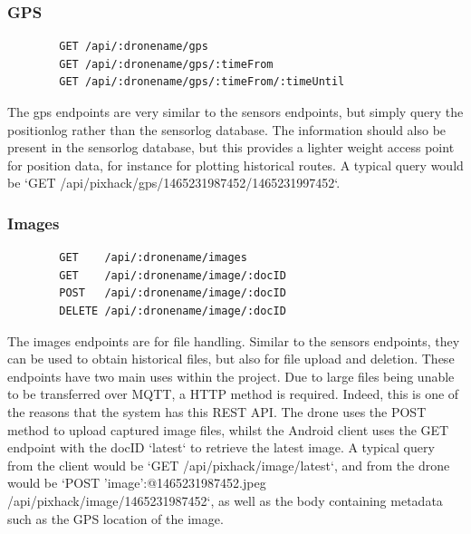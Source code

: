 \documentclass{article}
\begin{document}
\subsubsection{GPS}
\begin{center}
	\begin{lstlisting}
		GET /api/:dronename/gps
		GET /api/:dronename/gps/:timeFrom
		GET /api/:dronename/gps/:timeFrom/:timeUntil
	\end{lstlisting}
\end{center}
The gps endpoints are very similar to the sensors endpoints, but simply query the positionlog rather than the sensorlog database. The information should also be present in the sensorlog database, but this provides a lighter weight access point for position data, for instance for plotting historical routes. A typical query would be `GET /api/pixhack/gps/1465231987452/1465231997452`.


\subsubsection{Images}
\begin{center}
	\begin{lstlisting}
		GET    /api/:dronename/images
		GET    /api/:dronename/image/:docID
		POST   /api/:dronename/image/:docID
		DELETE /api/:dronename/image/:docID
	\end{lstlisting}
\end{center}
The images endpoints are for file handling. Similar to the sensors endpoints, they can be used to obtain historical files, but also for file upload and deletion. These endpoints have two main uses within the project. Due to large files being unable to be transferred over MQTT, a HTTP method is required. Indeed, this is one of the reasons that the system has this REST API. The drone uses the POST method to upload captured image files, whilst the Android client uses the GET endpoint with the docID `latest` to retrieve the latest image. A typical query from the client would be `GET /api/pixhack/image/latest`, and from the drone would be `POST {'image':@1465231987452.jpeg} /api/pixhack/image/1465231987452`, as well as the body containing metadata such as the GPS location of the image. 
\end{document}
